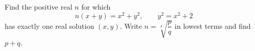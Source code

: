 Find the positive real $n$ for which
\[
n(x+y)=x^2+y^2,\qquad y^2=x^2+2
\]
has exactly one real solution $(x,y)$. Write $n=\sqrt[4]{\dfrac{p}{q}}$ in lowest terms and find $p+q$.
